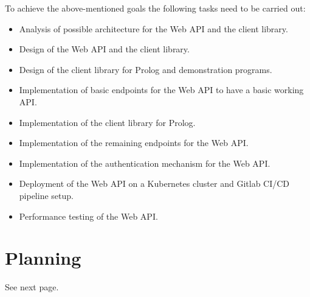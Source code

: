 \documentclass[en]{customTemplate}
\begin{document}
To achieve the above-mentioned goals the following tasks need to be carried out:

\begin{itemize}
    \item Analysis of possible architecture for the Web API and the client library.
    \item Design of the Web API and the client library.
    \item Design of the client library for Prolog and demonstration programs. 
    \item Implementation of basic endpoints for the Web API to have a basic working API.
    \item Implementation of the client library for Prolog.
    \item Implementation of the remaining endpoints for the Web API.
    \item Implementation of the authentication mechanism for the Web API.
    \item Deployment of the Web API on a Kubernetes cluster and Gitlab CI/CD pipeline setup.
    \item Performance testing of the Web API.
\end{itemize}

\section{Planning}   

See next page.

\fancyhf{}
\renewcommand{\headrulewidth}{0pt}

\begin{sidewaysfigure}
\end{sidewaysfigure}
\end{document}
